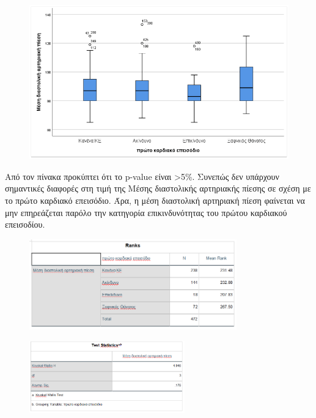 \clearpage

\begin{figure}[ht]
    \centering
    \includegraphics[width=\textwidth]{images/131.PNG}
\end{figure}

Από τον πίνακα \textbf{} προκύπτει ότι  το p-value είναι >5\%. Συνεπώς δεν υπάρχουν σημαντικές διαφορές στη τιμή της  Μέσης διαστολικής αρτηριακής πίεσης σε σχέση με το πρώτο καρδιακό επεισόδιο. Άρα, η μέση διαστολική αρτηριακή πίεση φαίνεται να μην επηρεάζεται παρόλο την κατηγορία επικινδυνότητας του πρώτου καρδιακού επεισοδίου.

\begin{figure}[h]
    \centering
    \includegraphics[width=0.8\textwidth]{images/132.PNG}
\end{figure}

\clearpage

\begin{figure}[ht]
    \centering
    \includegraphics[width=0.6\textwidth]{images/133.PNG}
\end{figure}